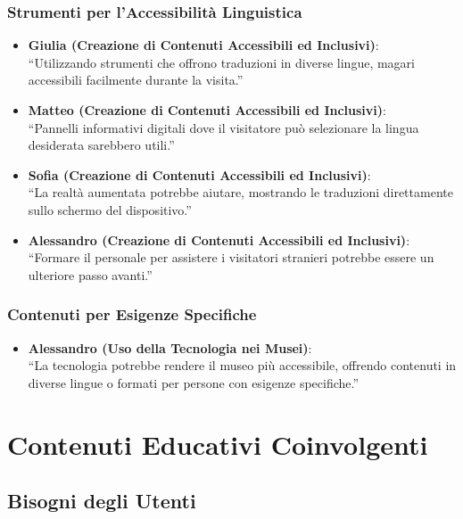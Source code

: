 \documentclass{article}
\begin{document}
\subsubsection{Strumenti per l'Accessibilità Linguistica}

\begin{itemize}
    \item \textbf{Giulia (Creazione di Contenuti Accessibili ed Inclusivi)}:\\
    ``Utilizzando strumenti che offrono traduzioni in diverse lingue, magari accessibili facilmente durante la visita.''
    \item \textbf{Matteo (Creazione di Contenuti Accessibili ed Inclusivi)}:\\
    ``Pannelli informativi digitali dove il visitatore può selezionare la lingua desiderata sarebbero utili.''
    \item \textbf{Sofia (Creazione di Contenuti Accessibili ed Inclusivi)}:\\
    ``La realtà aumentata potrebbe aiutare, mostrando le traduzioni direttamente sullo schermo del dispositivo.''
    \item \textbf{Alessandro (Creazione di Contenuti Accessibili ed Inclusivi)}:\\
    ``Formare il personale per assistere i visitatori stranieri potrebbe essere un ulteriore passo avanti.''
\end{itemize}

\subsubsection{Contenuti per Esigenze Specifiche}

\begin{itemize}
    \item \textbf{Alessandro (Uso della Tecnologia nei Musei)}:\\
    ``La tecnologia potrebbe rendere il museo più accessibile, offrendo contenuti in diverse lingue o formati per persone con esigenze specifiche.''
\end{itemize}

\section{Contenuti Educativi Coinvolgenti}

\subsection{Bisogni degli Utenti}
\end{document}
